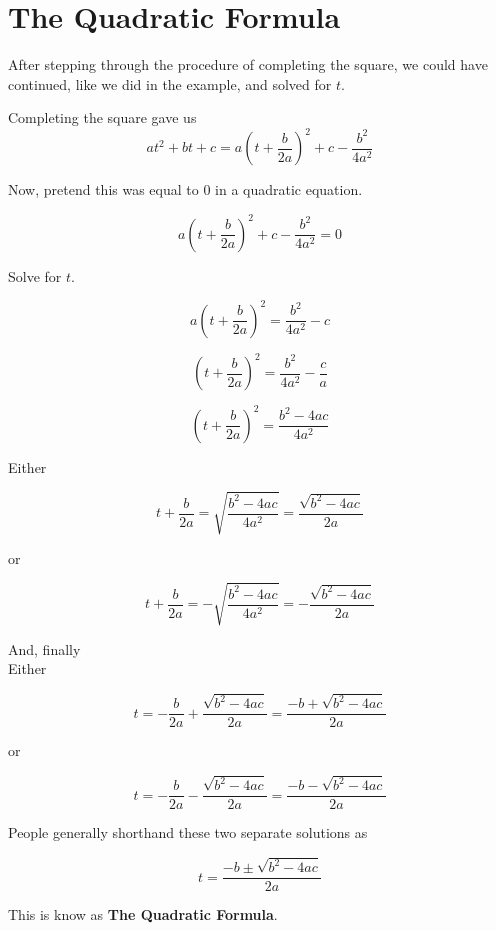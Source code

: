 \documentclass{ximera}
\begin{document}
\section{The Quadratic Formula}


After stepping through the procedure of completing the square, we could have continued, like we did in the example, and solved for $t$.


Completing the square gave us 
\[ a t^2 + b t + c = a(t + \frac{b}{2 a})^2 + c - \frac{b^2}{4 a^2} \]


Now, pretend this was equal to $0$ in a quadratic equation.

\[ a(t + \frac{b}{2 a})^2 + c - \frac{b^2}{4 a^2}  = 0\]

Solve for $t$.


\[ a(t + \frac{b}{2 a})^2  = \frac{b^2}{4 a^2} - c\]

\[ (t + \frac{b}{2 a})^2  = \frac{b^2}{4 a^2} - \frac{c}{a}\]

\[ (t + \frac{b}{2 a})^2  = \frac{b^2 - 4 a c}{4 a^2} \]



Either 


\[ t + \frac{b}{2 a}  = \sqrt{\frac{b^2 - 4 a c}{4 a^2}}  = \frac{\sqrt{b^2 - 4 a c}}{2a}   \]

or


\[ t + \frac{b}{2 a}  = -\sqrt{\frac{b^2 - 4 a c}{4 a^2}} = -\frac{\sqrt{b^2 - 4 a c}}{2a}    \]


And, finally \\



Either 


\[ t   = - \frac{b}{2 a} + \frac{\sqrt{b^2 - 4 a c}}{2a}  = \frac{-b + \sqrt{b^2 - 4 a c}}{2a}      \]

or


\[ t  = - \frac{b}{2 a}  -\frac{\sqrt{b^2 - 4 a c}}{2a} =    \frac{-b - \sqrt{b^2 - 4 a c}}{2a}      \]




People generally shorthand these two separate solutions as



\[ t  =   \frac{-b \pm \sqrt{b^2 - 4 a c}}{2a}      \]


This is know as \textbf{The Quadratic Formula}.
\end{document}
